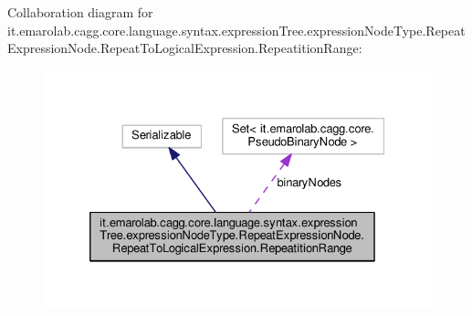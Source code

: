 Collaboration diagram for it.\-emarolab.\-cagg.\-core.\-language.\-syntax.\-expression\-Tree.\-expression\-Node\-Type.\-Repeat\-Expression\-Node.\-Repeat\-To\-Logical\-Expression.\-Repeatition\-Range\-:\nopagebreak
\begin{figure}[H]
\begin{center}
\leavevmode
\includegraphics[width=328pt]{classit_1_1emarolab_1_1cagg_1_1core_1_1language_1_1syntax_1_1expressionTree_1_1expressionNodeTypa81ec253bbd8f7885d3bb2ee0127c60b}
\end{center}
\end{figure}
